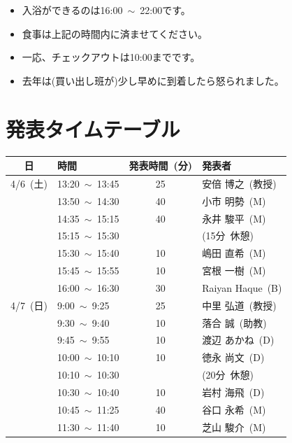 \documentclass[unicode,a4paper,11pt]{ltjsarticle}
\begin{document}
\begin{itemize}
      \item
            入浴ができるのは16:00\ $\sim$\ 22:00です。
      \item
            食事は上記の時間内に済ませてください。
      \item
            一応、チェックアウトは10:00までです。
      \item
            去年は(買い出し班が)少し早めに到着したら怒られました。
\end{itemize}

\section{発表タイムテーブル}

\begin{center}
      \begin{tabular}{clcl}\hline
            日        & 時間                 & 発表時間\ (分) & 発表者            \\ \hline
            4/6\ (土) & 13:20\ $\sim$\ 13:45 & 25             & 安倍 博之\ (教授) \\
                      & 13:50\ $\sim$\ 14:30 & 40             & 小市 明勢\ (M)    \\
                      & 14:35\ $\sim$\ 15:15 & 40             & 永井 駿平\ (M)    \\
                      & 15:15\ $\sim$\ 15:30 &                & (15分\ 休憩)      \\
                      & 15:30\ $\sim$\ 15:40 & 10             & 嶋田 直希\ (M)    \\
                      & 15:45\ $\sim$\ 15:55 & 10             & 宮根 一樹\ (M)    \\
                      & 16:00\ $\sim$\ 16:30 & 30             & Raiyan Haque\ (B) \\ \hline
            4/7\ (日) & 9:00\ $\sim$\ 9:25   & 25             & 中里 弘道\ (教授) \\
                      & 9:30\ $\sim$\ 9:40   & 10             & 落合 誠\ (助教)   \\
                      & 9:45\ $\sim$\ 9:55   & 10             & 渡辺 あかね\ (D)  \\
                      & 10:00\ $\sim$\ 10:10 & 10             & 徳永 尚文\ (D)    \\
                      & 10:10\ $\sim$\ 10:30 &                & (20分\ 休憩)      \\
                      & 10:30\ $\sim$\ 10:40 & 10             & 岩村 海飛\ (D)    \\
                      & 10:45\ $\sim$\ 11:25 & 40             & 谷口 永希\ (M)    \\
                      & 11:30\ $\sim$\ 11:40 & 10             & 芝山 駿介\ (M)    \\ \hline
      \end{tabular}
\end{center}
\end{document}

